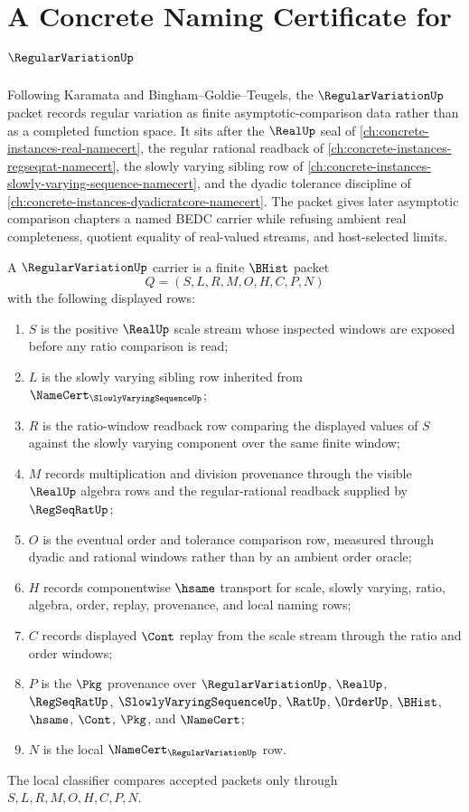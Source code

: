 \chapter{A Concrete Naming Certificate for $\RegularVariationUp$}
\label{ch:concrete-instances-regular-variation-namecert}

Following Karamata and Bingham--Goldie--Teugels, the $\RegularVariationUp$ packet records regular variation as finite asymptotic-comparison data rather than as a completed function space. It sits after the $\RealUp$ seal of \autoref{ch:concrete-instances-real-namecert}, the regular rational readback of \autoref{ch:concrete-instances-regseqrat-namecert}, the slowly varying sibling row of \autoref{ch:concrete-instances-slowly-varying-sequence-namecert}, and the dyadic tolerance discipline of \autoref{ch:concrete-instances-dyadicratcore-namecert}. The packet gives later asymptotic comparison chapters a named BEDC carrier while refusing ambient real completeness, quotient equality of real-valued streams, and host-selected limits.

\begin{definition}
\label{def:regular-variation-carrier}
A $\RegularVariationUp$ carrier is a finite $\BHist$ packet
$$
Q=(S,L,R,M,O,H,C,P,N)
$$
with the following displayed rows:
\begin{enumerate}
\item $S$ is the positive $\RealUp$ scale stream whose inspected windows are exposed before any ratio comparison is read;
\item $L$ is the slowly varying sibling row inherited from $\NameCert_{\SlowlyVaryingSequenceUp}$;
\item $R$ is the ratio-window readback row comparing the displayed values of $S$ against the slowly varying component over the same finite window;
\item $M$ records multiplication and division provenance through the visible $\RealUp$ algebra rows and the regular-rational readback supplied by $\RegSeqRatUp$;
\item $O$ is the eventual order and tolerance comparison row, measured through dyadic and rational windows rather than by an ambient order oracle;
\item $H$ records componentwise $\hsame$ transport for scale, slowly varying, ratio, algebra, order, replay, provenance, and local naming rows;
\item $C$ records displayed $\Cont$ replay from the scale stream through the ratio and order windows;
\item $P$ is the $\Pkg$ provenance over $\RegularVariationUp$, $\RealUp$, $\RegSeqRatUp$, $\SlowlyVaryingSequenceUp$, $\RatUp$, $\OrderUp$, $\BHist$, $\hsame$, $\Cont$, $\Pkg$, and $\NameCert$;
\item $N$ is the local $\NameCert_{\RegularVariationUp}$ row.
\end{enumerate}
The local classifier compares accepted packets only through $S,L,R,M,O,H,C,P,N$.
\end{definition}

